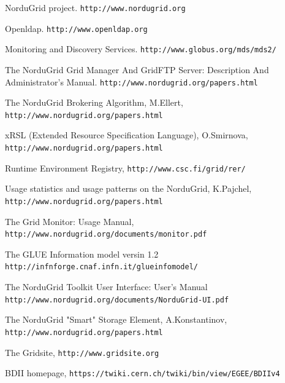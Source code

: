 \documentclass{article}
\begin{document}
\normalsize
\begin{thebibliography}{99}

	NorduGrid project. \texttt{http://www.nordugrid.org}

	Openldap. \texttt{http://www.openldap.org}

        Monitoring and Discovery Services. \texttt{http://www.globus.org/mds/mds2/}
	
	The NorduGrid Grid Manager And GridFTP Server: Description And Administrator's
	Manual. \texttt{http://www.nordugrid.org/papers.html}
	
	The NorduGrid Brokering Algorithm, M.Ellert,
	\texttt{http://www.nordugrid.org/papers.html}

	xRSL (Extended Resource Specification Language), O.Smirnova,
	\texttt{http://www.nordugrid.org/papers.html}
		
        Runtime Environment Registry,
	\texttt{http://www.csc.fi/grid/rer/}	

 Usage statistics and usage patterns on the NorduGrid,
	K.Pajchel,
	\texttt{http://www.nordugrid.org/papers.html}

 The Grid Monitor: Usage Manual,
	\texttt{http://www.nordugrid.org/documents/monitor.pdf}
	
 The GLUE Information model versin 1.2
	\texttt{http://infnforge.cnaf.infn.it/glueinfomodel/}	

 The NorduGrid Toolkit User Interface: User's Manual
        \texttt{http://www.nordugrid.org/documents/NorduGrid-UI.pdf}

 The NorduGrid "Smart" Storage Element, A.Konstantinov,
	\texttt{http://www.nordugrid.org/papers.html}
		
 The Gridsite,
	\texttt{http://www.gridsite.org}
		
 BDII homepage,
	\texttt{https://twiki.cern.ch/twiki/bin/view/EGEE/BDIIv4}

\end{thebibliography}
\end{document}
